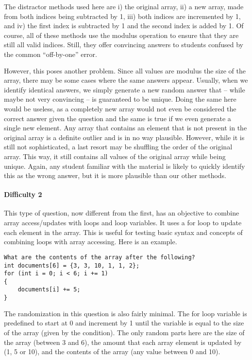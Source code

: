\documentclass{article}
\begin{document}
The distractor methods used here are i) the original array, ii) a new array, made from both indices being subtracted by 1, iii) both indices are incremented by 1, and iv) the first index is
subtracted by 1 and the second index is added by 1. Of course, all of these methods use the modulus operation to ensure that they are still all valid indices. Still, they offer convincing 
answers to students confused by the common ``off-by-one'' error. 

However, this poses another problem. Since all values are modulus the size of the array, there may be some cases where the same answers appear. Usually, when we identify identical answers,
we simply generate a new random answer that -- while maybe not very convincing -- is guaranteed to be unique. Doing the same here would be useless, as a completely new array would not
even be considered the correct answer given the question and the same is true if we even generate a single new element. Any array that contains an element that is not present in the 
original array is a definite outlier and is in no way plausible. However, while it is still not sophisticated, a last resort may be shuffling the order of the original array. This way, it still contains all
values of the original array while being unique. Again, any student familiar with the material is likely to quickly identify this as the wrong answer, but it is more plausible than our other methods.

\paragraph{Difficulty 2} \hfill \par

This type of question, now different from the first, has an objective to combine array access/updates with loops and loop variables. It uses a for loop to update each element in the array. This is
useful for testing basic syntax and concepts of combining loops with array accessing. Here is an example. 

\begin{lstlisting}
What are the contents of the array after the following?
int documents[6] = {3, 3, 10, 1, 1, 2};
for (int i = 0; i < 6; i += 1)
{ 
	documents[i] += 5; 
} 
\end{lstlisting}


The randomization in this question is also fairly minimal. The for loop variable is predefined to start at 0 and increment by 1 until the variable is equal to the size of the array (given by the 
condition). The only random parts here are the size of the array (between 3 and 6), the amount that each array element is updated by (1, 5 or 10), and the contents of the array (any value 
between 0 and 10). 
\end{document}
